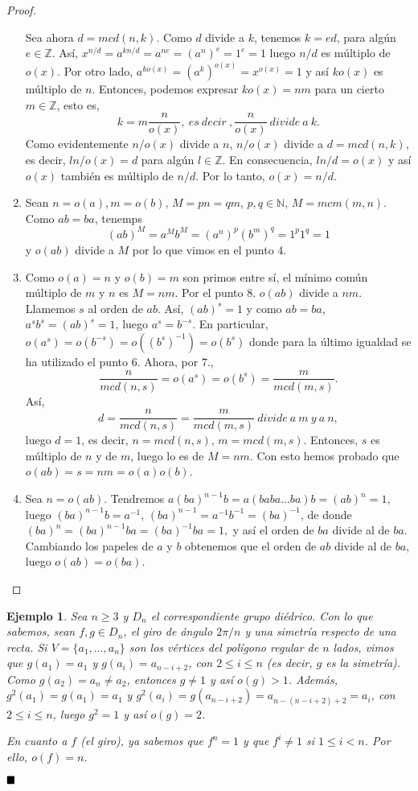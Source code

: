 \documentclass[12pt]{article}
\newtheorem{example}{Ejemplo}[theorem]
\begin{document}
\begin{proof}
\begin{enumerate}
Sea ahora $d = mcd(n,k)$. Como $d$ divide a $k$, tenemos $k=ed$, para algún $e \in \mathbb{Z}$. Así, $x^{n/d} = a^{kn/d} = a^{ne} = (a^n)^e = 1^e=1$ luego $n/d$ es múltiplo de $o(x)$. Por otro lado, $a^{ko(x)} = (a^k)^{o(x)} = x^{o(x)} = 1$ y así $ko(x)$ es múltiplo de $n$. Entonces, podemos expresar $ko(x) = nm$ para un cierto $m \in \mathbb{Z}$, esto es, $$k = m \dfrac{n}{o(x)},~es~decir~, \dfrac{n}{o(x)}~divide~a~k.$$ Como evidentemente $n/o(x)$ divide a $n$, $n/o(x)$ divide a $d = mcd(n,k)$, es decir, $l n/o(x) = d$ para algún $l \in \mathbb{Z}$. En consecuencia, $ln/d = o(x)$ y así $o(x)$ también es múltiplo de $n/d$. Por lo tanto, $o(x) = n/d$.
\item Sean $n = o(a), m=o(b)$, $M = pn = qm$, $p,q \in \mathbb{N}$, $M = mcm(m,n)$. Como $ab = ba$, tenemps $$(ab)^M = a^Mb^M = (a^n)^p(b^m)^q = 1^p1^q = 1$$ y $o(ab)$ divide a $M$ por lo que vimos en el punto $4.$
\item Como $o(a) = n$ y $o(b) = m$ son primos entre sí, el mínimo común múltiplo de $m$ y $n$ es $M = nm$. Por el punto $8.$ $o(ab)$ divide a $nm$. Llamemos $s$ al orden de $ab$. Así, $(ab)^s = 1$ y como $ab = ba$, $a^sb^s=(ab)^s = 1$, luego $a^s = b^{-s}$. En particular, $o(a^s) = o(b^{-s}) = o((b^s)^{-1}) = o(b^s)$ donde para la último igualdad se ha utilizado el punto $6.$ Ahora, por $7.$, $$\dfrac{n}{mcd(n,s)} = o(a^s) = o(b^s) = \dfrac{m}{mcd(m,s)}.$$ Así, $$d = \dfrac{n}{mcd(n,s)} = \dfrac{m}{mcd(m,s)}~divide~a~m~y~a~n,$$ luego $d=1$, es decir, $n = mcd(n,s)$, $m = mcd(m,s)$. Entonces, $s$ es múltiplo de $n$ y de $m$, luego lo es de $M = nm$. Con esto hemos probado que $o(ab) = s = nm = o(a)o(b)$.
\item Sea $n = o(ab)$. Tendremos $a(ba)^{n-1}b = a(baba...ba)b = (ab)^n = 1,$ luego $(ba)^{n-1}b = a^{-1}$, $(ba)^{n-1} = a^{-1}b^{-1} = (ba)^{-1}$, de donde $(ba)^n = (ba)^{n-1}ba = (ba)^{-1}ba = 1,$ y así el orden de $ba$ divide al de $ba$. Cambiando los papeles de $a$ y $b$ obtenemos que el orden de $ab$ divide al de $ba$, luego $o(ab)=o(ba)$.
\end{enumerate}
\end{proof}

\begin{example}\label{ej:gDie2} Sea $n\geq 3$ y $D_n$ el correspondiente grupo diédrico. Con lo que sabemos, sean $f,g \in D_n$, el giro de ángulo $2\pi/n$ y una simetría respecto de una recta. Si $V = \lbrace a_1, \ldots, a_n \rbrace$ son los vértices del polígono regular de $n$ lados, vimos que $g(a_1) = a_1$ y $g(a_i) = a_{n-i+2}$, con $2 \leq i \leq n$ (es decir, $g$ es la simetría). Como $g(a_2) = a_n \neq a_2$, entonces $g\neq 1$ y así $o(g)>1$. Además, $g^2(a_1) = g(a_1) = a_1$ y $g^2(a_i) = g(a_{n-i+2}) = a_{n-(n-i+2)+2} = a_{i}$, con $2 \leq i \leq n$, luego $g^2 = 1$ y así $o(g) = 2$.

En cuanto a $f$ (el giro), ya sabemos que $f^n = 1$ y que $f^i \neq 1$ si $1 \leq i <n$. Por ello, $o(f) = n$.

\end{example}
$\hfill \blacksquare$
\end{document}

